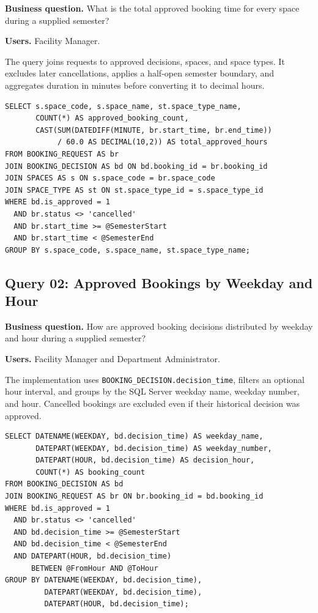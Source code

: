 \textbf{Business question.} What is the total approved booking time for every space during a supplied semester?

\textbf{Users.} Facility Manager.

The query joins requests to approved decisions, spaces, and space types. It excludes later cancellations, applies a half-open semester boundary, and aggregates duration in minutes before converting it to decimal hours.

\begin{lstlisting}[caption={Core of Query 01.}]
SELECT s.space_code, s.space_name, st.space_type_name,
       COUNT(*) AS approved_booking_count,
       CAST(SUM(DATEDIFF(MINUTE, br.start_time, br.end_time))
            / 60.0 AS DECIMAL(10,2)) AS total_approved_hours
FROM BOOKING_REQUEST AS br
JOIN BOOKING_DECISION AS bd ON bd.booking_id = br.booking_id
JOIN SPACES AS s ON s.space_code = br.space_code
JOIN SPACE_TYPE AS st ON st.space_type_id = s.space_type_id
WHERE bd.is_approved = 1
  AND br.status <> 'cancelled'
  AND br.start_time >= @SemesterStart
  AND br.start_time < @SemesterEnd
GROUP BY s.space_code, s.space_name, st.space_type_name;
\end{lstlisting}

\subsection{Query 02: Approved Bookings by Weekday and Hour}

\textbf{Business question.} How are approved booking decisions distributed by weekday and hour during a supplied semester?

\textbf{Users.} Facility Manager and Department Administrator.

The implementation uses \texttt{BOOKING\_DECISION.decision\_time}, filters an optional hour interval, and groups by the SQL Server weekday name, weekday number, and hour. Cancelled bookings are excluded even if their historical decision was approved.

\begin{lstlisting}[caption={Core of Query 02.}]
SELECT DATENAME(WEEKDAY, bd.decision_time) AS weekday_name,
       DATEPART(WEEKDAY, bd.decision_time) AS weekday_number,
       DATEPART(HOUR, bd.decision_time) AS decision_hour,
       COUNT(*) AS booking_count
FROM BOOKING_DECISION AS bd
JOIN BOOKING_REQUEST AS br ON br.booking_id = bd.booking_id
WHERE bd.is_approved = 1
  AND br.status <> 'cancelled'
  AND bd.decision_time >= @SemesterStart
  AND bd.decision_time < @SemesterEnd
  AND DATEPART(HOUR, bd.decision_time)
      BETWEEN @FromHour AND @ToHour
GROUP BY DATENAME(WEEKDAY, bd.decision_time),
         DATEPART(WEEKDAY, bd.decision_time),
         DATEPART(HOUR, bd.decision_time);
\end{lstlisting}


